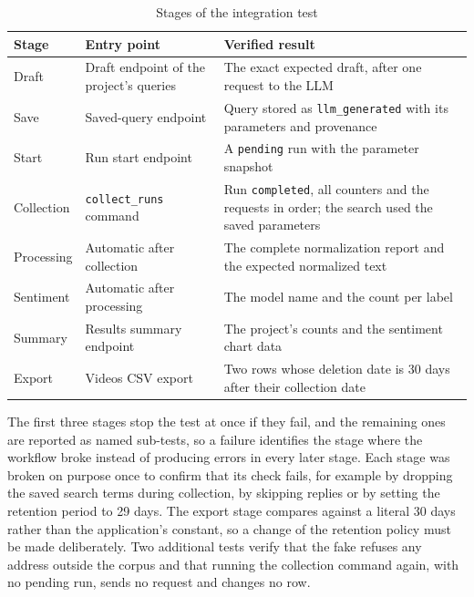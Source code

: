 \begingroup
{}
\begin{table}[htbp]
    \centering
    \footnotesize
    \caption{Stages of the integration test}
    \label{tab:integration_stages}
    \begin{tabularx}
        {\textwidth}{>{\raggedright\arraybackslash}p{2.0cm}>{\raggedright\arraybackslash}p{4.6cm}X}
        \toprule
        \textbf{Stage} & \textbf{Entry point}                    & \textbf{Verified result}                                                                             \\
        \midrule
        Draft          & Draft endpoint of the project's queries & The exact expected draft, after one request to the LLM                                               \\
        Save           & Saved-query endpoint                    & Query stored as \texttt{llm\_generated} with its parameters and provenance                           \\
        Start          & Run start endpoint                      & A \texttt{pending} run with the parameter snapshot                                                   \\
        Collection     & \texttt{collect\_runs} command          & Run \texttt{completed}, all counters and the requests in order; the search used the saved parameters \\
        Processing     & Automatic after collection              & The complete normalization report and the expected normalized text                                   \\
        Sentiment      & Automatic after processing              & The model name and the count per label                                                               \\
        Summary        & Results summary endpoint                & The project's counts and the sentiment chart data                                                    \\
        Export         & Videos CSV export                       & Two rows whose deletion date is 30 days after their collection date                                  \\
        \bottomrule
    \end{tabularx}
\end{table}
\endgroup

The first three stages stop the test at once if they fail, and the remaining ones are reported as named sub-tests, so a failure identifies the stage where the workflow broke instead of producing errors in every later stage. Each stage was broken on purpose once to confirm that its check fails, for example by dropping the saved search terms during collection, by skipping replies or by setting the retention period to 29 days. The export stage compares against a literal 30 days rather than the application's constant, so a change of the retention policy must be made deliberately. Two additional tests verify that the fake refuses any address outside the corpus and that running the collection command again, with no pending run, sends no request and changes no row.

